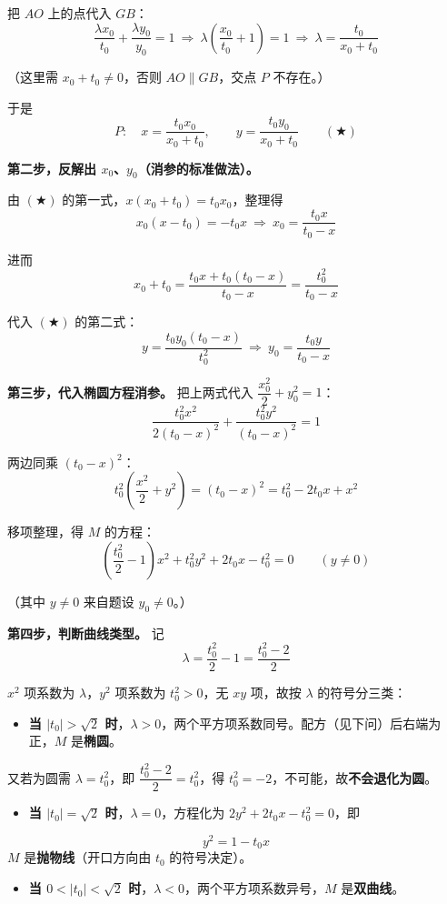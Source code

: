 \begin{answer}
把 $AO$ 上的点代入 $GB$：
\nopagebreak[4]
\[\frac{\lambda x_0}{t_0}+\frac{\lambda y_0}{y_0}=1\ \Longrightarrow\ \lambda\left(\frac{x_0}{t_0}+1\right)=1\ \Longrightarrow\ \lambda=\frac{t_0}{x_0+t_0}\]

（这里需 $x_0+t_0\ne0$，否则 $AO\parallel GB$，交点 $P$ 不存在。）

于是
\nopagebreak[4]
\[P:\quad x=\frac{t_0x_0}{x_0+t_0},\qquad y=\frac{t_0y_0}{x_0+t_0}\qquad(\bigstar)\]

\textbf{第二步，反解出 $x_0$、$y_0$（消参的标准做法）。}

由 $(\bigstar)$ 的第一式，$x\left(x_0+t_0\right)=t_0x_0$，整理得
\nopagebreak[4]
\[x_0\left(x-t_0\right)=-t_0x\ \Longrightarrow\ x_0=\frac{t_0x}{t_0-x}\]

进而
\nopagebreak[4]
\[x_0+t_0=\frac{t_0x+t_0\left(t_0-x\right)}{t_0-x}=\frac{t_0^2}{t_0-x}\]

代入 $(\bigstar)$ 的第二式：
\nopagebreak[4]
\[y=\frac{t_0y_0\left(t_0-x\right)}{t_0^2}\ \Longrightarrow\ y_0=\frac{t_0y}{t_0-x}\]

\textbf{第三步，代入椭圆方程消参。} 把上两式代入 $\dfrac{x_0^2}{2}+y_0^2=1$：
\nopagebreak[4]
\[\frac{t_0^2x^2}{2\left(t_0-x\right)^2}+\frac{t_0^2y^2}{\left(t_0-x\right)^2}=1\]

两边同乘 $\left(t_0-x\right)^2$：
\nopagebreak[4]
\[t_0^2\left(\frac{x^2}{2}+y^2\right)=\left(t_0-x\right)^2=t_0^2-2t_0x+x^2\]

移项整理，得 $M$ 的方程：
\nopagebreak[4]
\[\boxed{\left(\frac{t_0^2}{2}-1\right)x^2+t_0^2y^2+2t_0x-t_0^2=0\qquad(y\ne0)}\]

（其中 $y\ne0$ 来自题设 $y_0\ne0$。）

\textbf{第四步，判断曲线类型。} 记
\nopagebreak[4]
\[\lambda=\frac{t_0^2}{2}-1=\frac{t_0^2-2}{2}\]

$x^2$ 项系数为 $\lambda$，$y^2$ 项系数为 $t_0^2>0$，无 $xy$ 项，故按 $\lambda$ 的符号分三类：

\begin{itemize}
\item \textbf{当 $\left|t_0\right|>\sqrt2$ 时}，$\lambda>0$，两个平方项系数同号。配方（见下问）后右端为正，$M$ 是\textbf{椭圆}。
\end{itemize}
  又若为圆需 $\lambda=t_0^2$，即 $\dfrac{t_0^2-2}{2}=t_0^2$，得 $t_0^2=-2$，不可能，故\textbf{不会退化为圆}。
\begin{itemize}
\item \textbf{当 $\left|t_0\right|=\sqrt2$ 时}，$\lambda=0$，方程化为 $2y^2+2t_0x-t_0^2=0$，即
\end{itemize}
\nopagebreak[4]
\[y^2=1-t_0x\]
  $M$ 是\textbf{抛物线}（开口方向由 $t_0$ 的符号决定）。
\begin{itemize}
\item \textbf{当 $0<\left|t_0\right|<\sqrt2$ 时}，$\lambda<0$，两个平方项系数异号，$M$ 是\textbf{双曲线}。
\end{itemize}


\end{answer}
